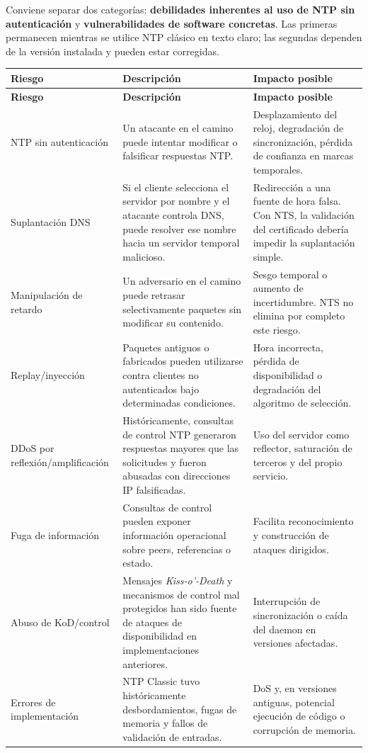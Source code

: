 \documentclass[11pt,a4paper]{article}
\begin{document}
Conviene separar dos categorías: \textbf{debilidades inherentes al uso de NTP sin autenticación} y \textbf{vulnerabilidades de software concretas}. Las primeras permanecen mientras se utilice NTP clásico en texto claro; las segundas dependen de la versión instalada y pueden estar corregidas.

\begin{longtable}{>{\raggedright\arraybackslash}p{3.3cm} >{\raggedright\arraybackslash}p{5.2cm} >{\raggedright\arraybackslash}p{5.2cm}}
\toprule
\textbf{Riesgo} & \textbf{Descripción} & \textbf{Impacto posible} \\
\midrule
\endfirsthead
\toprule
\textbf{Riesgo} & \textbf{Descripción} & \textbf{Impacto posible} \\
\midrule
\endhead
NTP sin autenticación & Un atacante en el camino puede intentar modificar o falsificar respuestas NTP. & Desplazamiento del reloj, degradación de sincronización, pérdida de confianza en marcas temporales. \\
\addlinespace
Suplantación DNS & Si el cliente selecciona el servidor por nombre y el atacante controla DNS, puede resolver ese nombre hacia un servidor temporal malicioso. & Redirección a una fuente de hora falsa. Con NTS, la validación del certificado debería impedir la suplantación simple. \\
\addlinespace
Manipulación de retardo & Un adversario en el camino puede retrasar selectivamente paquetes sin modificar su contenido. & Sesgo temporal o aumento de incertidumbre. NTS no elimina por completo este riesgo. \\
\addlinespace
Replay/inyección & Paquetes antiguos o fabricados pueden utilizarse contra clientes no autenticados bajo determinadas condiciones. & Hora incorrecta, pérdida de disponibilidad o degradación del algoritmo de selección. \\
\addlinespace
DDoS por reflexión/amplificación & Históricamente, consultas de control NTP generaron respuestas mayores que las solicitudes y fueron abusadas con direcciones IP falsificadas. & Uso del servidor como reflector, saturación de terceros y del propio servicio. \\
\addlinespace
Fuga de información & Consultas de control pueden exponer información operacional sobre peers, referencias o estado. & Facilita reconocimiento y construcción de ataques dirigidos. \\
\addlinespace
Abuso de KoD/control & Mensajes \emph{Kiss-o'-Death} y mecanismos de control mal protegidos han sido fuente de ataques de disponibilidad en implementaciones anteriores. & Interrupción de sincronización o caída del daemon en versiones afectadas. \\
\addlinespace
Errores de implementación & NTP Classic tuvo históricamente desbordamientos, fugas de memoria y fallos de validación de entradas. & DoS y, en versiones antiguas, potencial ejecución de código o corrupción de memoria. \\
\bottomrule
\end{longtable}
\end{document}
